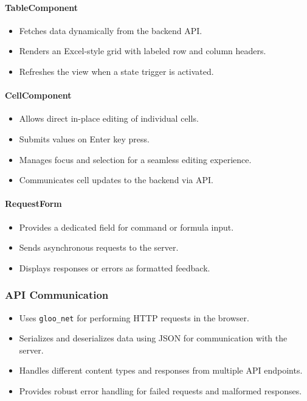 \paragraph{TableComponent}
\begin{itemize}
    \item Fetches data dynamically from the backend API.
    \item Renders an Excel-style grid with labeled row and column headers.
    \item Refreshes the view when a state trigger is activated.
\end{itemize}

\paragraph{CellComponent}
\begin{itemize}
    \item Allows direct in-place editing of individual cells.
    \item Submits values on Enter key press.
    \item Manages focus and selection for a seamless editing experience.
    \item Communicates cell updates to the backend via API.
\end{itemize}

\paragraph{RequestForm}
\begin{itemize}
    \item Provides a dedicated field for command or formula input.
    \item Sends asynchronous requests to the server.
    \item Displays responses or errors as formatted feedback.
\end{itemize}

\subsubsection{API Communication}

\begin{itemize}
    \item Uses \texttt{gloo\_net} for performing HTTP requests in the browser.
    \item Serializes and deserializes data using JSON for communication with the server.
    \item Handles different content types and responses from multiple API endpoints.
    \item Provides robust error handling for failed requests and malformed responses.
\end{itemize}

